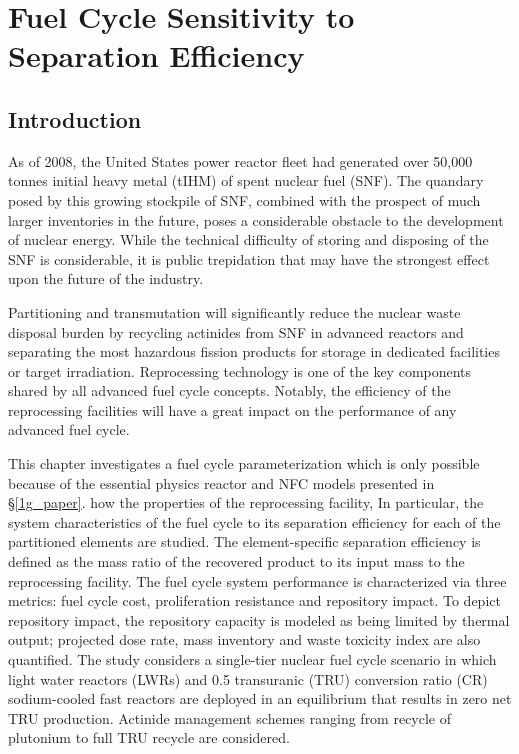 \chapter{Fuel Cycle Sensitivity to Separation Efficiency}
\label{ses_paper}



\section{Introduction}
\label{ses_sec:intro}
As of 2008, the United States power reactor fleet had generated over
50,000 tonnes initial heavy metal (tIHM) of spent nuclear fuel (SNF). 
The quandary posed by this growing stockpile of SNF, combined with the
prospect of much larger inventories in the future, poses a considerable
obstacle to the development of nuclear energy.  While the technical
difficulty of storing and disposing of the SNF is considerable, it is
public trepidation that may have the strongest effect upon the future of
the industry.  

Partitioning and transmutation will significantly reduce the nuclear
waste disposal burden by recycling actinides from SNF in advanced
reactors and separating the most hazardous fission products for storage
in dedicated facilities or target irradiation.  Reprocessing technology
is one of the key components shared by all advanced fuel cycle concepts.
 Notably, the efficiency of the reprocessing facilities will have a
great impact on the performance of any advanced fuel cycle. 

This chapter investigates a fuel cycle parameterization which is only possible 
because of the essential physics reactor and NFC models presented in \S \ref{1g_paper}.
how the properties of the reprocessing facility,
In particular, the system characteristics of the fuel cycle to its separation efficiency 
for each of the partitioned elements are studied. 
The element-specific separation efficiency is defined as the mass ratio of
the recovered product to its input mass to the reprocessing facility. 
The fuel cycle system performance is characterized via three metrics:
fuel cycle cost, proliferation resistance and repository impact.  To
depict repository impact, the repository capacity is modeled as being
limited by thermal output; projected dose rate, mass inventory and waste
toxicity index are also quantified.  The study considers a single-tier
nuclear fuel cycle scenario in which light water reactors (LWRs) and 0.5
transuranic (TRU) conversion ratio (CR) sodium-cooled fast reactors are
deployed in an equilibrium that results in zero net TRU production. 
Actinide management schemes ranging from recycle of plutonium to full
TRU recycle are considered.

